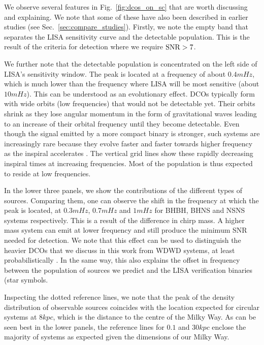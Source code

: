 \vspace{1em}

We observe several features in Fig.~\ref{fig:dcos_on_sc} that are worth discussing and explaining. We note that some of these have also been described in earlier studies (see Sec.~\ref{sec:compare_studies}). Firstly, we note the empty band that separates the LISA sensitivity curve and the detectable population. This is the result of the criteria for detection where we require $\rm{SNR} > 7$.

We further note that the detectable population is concentrated on the left side of LISA's sensitivity window. The peak is located at a frequency of about $0.4 \unit{mHz}$, which is much lower than the frequency where LISA will be most sensitive (about $10 \unit{mHz}$). This can be understood as an evolutionary effect. DCOs typically form with wide orbits (low frequencies) that would not be detectable yet. Their orbits shrink as they lose angular momentum in the form of gravitational waves leading to an increase of their orbital frequency until they become detectable. Even though the signal emitted by a more compact binary is stronger, such systems are increasingly rare because they evolve faster and faster towards higher frequency as the inspiral accelerates \citep{Peters+1964}. The vertical grid lines show these rapidly decreasing inspiral times at increasing frequencies. Most of the population is thus expected to reside at low frequencies.

In the lower three panels, we show the contributions of the different types of sources. Comparing them, one can observe the shift in the frequency at which the peak is located, at $0.3 \unit{mHz}$, $0.7 \unit{mHz}$ and $1 \unit{mHz}$ for BHBH, BHNS and NSNS systems respectively. This is a result of the difference in chirp mass. A higher mass system can emit at lower frequency and still produce the minimum SNR needed for detection. We note that this effect can be used to distinguish the heavier DCOs that we discuss in this work from WDWD systems, at least probabilistically \citep[e.g.][]{Sesana+2020}. In the same way, this also explains the offset in frequency between the population of sources we predict and the LISA verification binaries (star symbols.

Inspecting the dotted reference lines, we note that the peak of the density distribution of observable sources coincides with the location expected for circular systems at $8 \unit{kpc}$, which is the distance to the centre of the Milky Way. As can be seen best in the lower panels, the reference lines for $0.1$ and $30 \unit{kpc}$ enclose the majority of systems as expected given the dimensions of our Milky Way.

